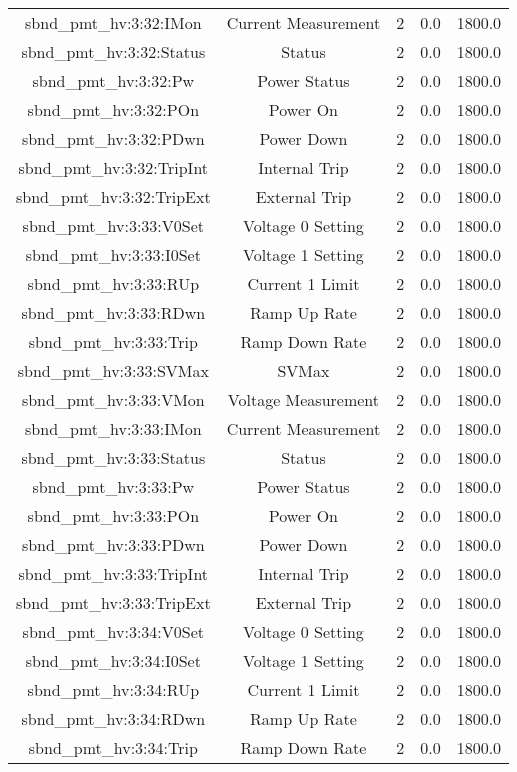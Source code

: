 \begin{center}
\begin{longtable}{c | c c c c }
sbnd\_pmt\_hv:3:32:IMon & Current Measurement & 2 & 0.0 & 1800.0\\ 
sbnd\_pmt\_hv:3:32:Status & Status & 2 & 0.0 & 1800.0\\ 
sbnd\_pmt\_hv:3:32:Pw & Power Status & 2 & 0.0 & 1800.0\\ 
sbnd\_pmt\_hv:3:32:POn & Power On & 2 & 0.0 & 1800.0\\ 
sbnd\_pmt\_hv:3:32:PDwn & Power Down & 2 & 0.0 & 1800.0\\ 
sbnd\_pmt\_hv:3:32:TripInt & Internal Trip & 2 & 0.0 & 1800.0\\ 
sbnd\_pmt\_hv:3:32:TripExt & External Trip & 2 & 0.0 & 1800.0\\ 
sbnd\_pmt\_hv:3:33:V0Set & Voltage 0 Setting & 2 & 0.0 & 1800.0\\ 
sbnd\_pmt\_hv:3:33:I0Set & Voltage 1 Setting & 2 & 0.0 & 1800.0\\ 
sbnd\_pmt\_hv:3:33:RUp & Current 1 Limit & 2 & 0.0 & 1800.0\\ 
sbnd\_pmt\_hv:3:33:RDwn & Ramp Up Rate & 2 & 0.0 & 1800.0\\ 
sbnd\_pmt\_hv:3:33:Trip & Ramp Down Rate & 2 & 0.0 & 1800.0\\ 
sbnd\_pmt\_hv:3:33:SVMax & SVMax & 2 & 0.0 & 1800.0\\ 
sbnd\_pmt\_hv:3:33:VMon & Voltage Measurement & 2 & 0.0 & 1800.0\\ 
sbnd\_pmt\_hv:3:33:IMon & Current Measurement & 2 & 0.0 & 1800.0\\ 
sbnd\_pmt\_hv:3:33:Status & Status & 2 & 0.0 & 1800.0\\ 
sbnd\_pmt\_hv:3:33:Pw & Power Status & 2 & 0.0 & 1800.0\\ 
sbnd\_pmt\_hv:3:33:POn & Power On & 2 & 0.0 & 1800.0\\ 
sbnd\_pmt\_hv:3:33:PDwn & Power Down & 2 & 0.0 & 1800.0\\ 
sbnd\_pmt\_hv:3:33:TripInt & Internal Trip & 2 & 0.0 & 1800.0\\ 
sbnd\_pmt\_hv:3:33:TripExt & External Trip & 2 & 0.0 & 1800.0\\ 
sbnd\_pmt\_hv:3:34:V0Set & Voltage 0 Setting & 2 & 0.0 & 1800.0\\ 
sbnd\_pmt\_hv:3:34:I0Set & Voltage 1 Setting & 2 & 0.0 & 1800.0\\ 
sbnd\_pmt\_hv:3:34:RUp & Current 1 Limit & 2 & 0.0 & 1800.0\\ 
sbnd\_pmt\_hv:3:34:RDwn & Ramp Up Rate & 2 & 0.0 & 1800.0\\ 
sbnd\_pmt\_hv:3:34:Trip & Ramp Down Rate & 2 & 0.0 & 1800.0\\ 

\end{longtable}
\end{center}
